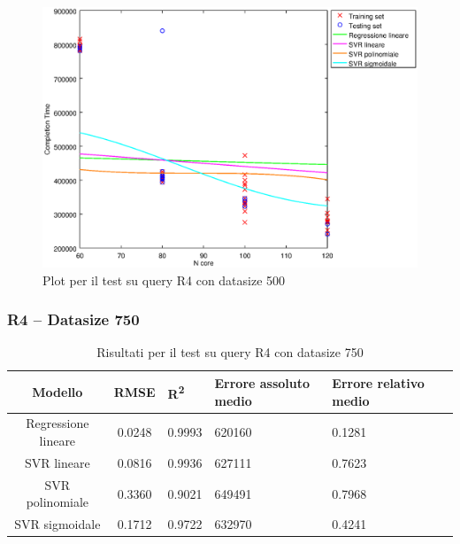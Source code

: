 \documentclass[a4paper,11pt]{article}
\begin{document}
\begin {figure}[hbtp]
\centering
\includegraphics[width=\textwidth]{output/R4_500/plot_R4_500.eps}
\caption {Plot per il test su query R4 con datasize 500}
\end {figure}
\newpage
\subsubsection{R4 -- Datasize 750}
\begin{table}[bhpt]
	\centering
	\begin{adjustbox}{center}
		\begin{tabular}{c | c M{1cm} M{2.5cm} M{2.5cm} M{1.8cm}}
			Modello & RMSE & R\textsuperscript{2} & Errore assoluto medio & Errore relativo medio \tabularnewline
			\hline
			Regressione lineare & 0.0248 & 0.9993 & 620160 & 0.1281 \\
			SVR lineare & 0.0816 & 0.9936 & 627111 & 0.7623 \\
			SVR polinomiale & 0.3360 & 0.9021 & 649491 & 0.7968 \\
			SVR sigmoidale & 0.1712 & 0.9722 & 632970 & 0.4241 \\
		\end{tabular}
	\end{adjustbox}
	\\
	\caption{Risultati per il test su query R4 con datasize 750}
	\label{table_R4_750}
\end{table}
\end{document}

